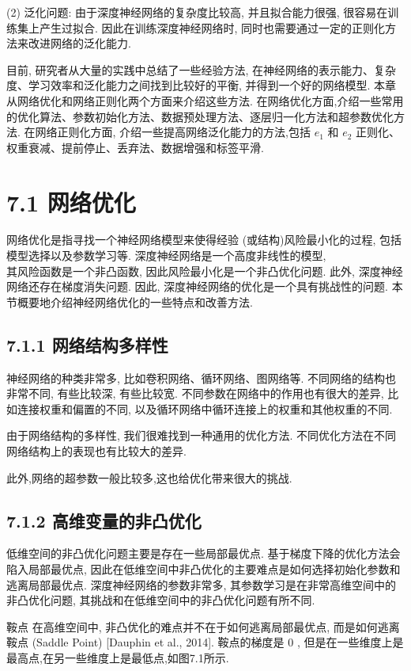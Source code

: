 \documentclass[10pt]{article}
\begin{document}
(2) 泛化问题: 由于深度神经网络的复杂度比较高, 并且拟合能力很强, 很容易在训练集上产生过拟合. 因此在训练深度神经网络时, 同时也需要通过一定的正则化方法来改进网络的泛化能力.

目前, 研究者从大量的实践中总结了一些经验方法, 在神经网络的表示能力、复杂度、学习效率和泛化能力之间找到比较好的平衡, 并得到一个好的网络模型. 本章从网络优化和网络正则化两个方面来介绍这些方法. 在网络优化方面,介绍一些常用的优化算法、参数初始化方法、数据预处理方法、逐层归一化方法和超参数优化方法. 在网络正则化方面, 介绍一些提高网络泛化能力的方法,包括 $e_{1}$ 和 $e_{2}$ 正则化、权重衰减、提前停止、丢弃法、数据增强和标签平滑.

\section*{7.1 网络优化}
网络优化是指寻找一个神经网络模型来使得经验 (或结构)风险最小化的过程, 包括模型选择以及参数学习等. 深度神经网络是一个高度非线性的模型,\\
其风险函数是一个非凸函数, 因此风险最小化是一个非凸优化问题. 此外, 深度神经网络还存在梯度消失问题. 因此, 深度神经网络的优化是一个具有挑战性的问题. 本节概要地介绍神经网络优化的一些特点和改善方法.

\subsection*{7.1.1 网络结构多样性}
神经网络的种类非常多, 比如卷积网络、循环网络、图网络等. 不同网络的结构也非常不同, 有些比较深, 有些比较宽. 不同参数在网络中的作用也有很大的差异, 比如连接权重和偏置的不同, 以及循环网络中循环连接上的权重和其他权重的不同.

由于网络结构的多样性, 我们很难找到一种通用的优化方法. 不同优化方法在不同网络结构上的表现也有比较大的差异.

此外,网络的超参数一般比较多,这也给优化带来很大的挑战.

\subsection*{7.1.2 高维变量的非凸优化}
低维空间的非凸优化问题主要是存在一些局部最优点. 基于梯度下降的优化方法会陷入局部最优点, 因此在低维空间中非凸优化的主要难点是如何选择初始化参数和逃离局部最优点. 深度神经网络的参数非常多, 其参数学习是在非常高维空间中的非凸优化问题, 其挑战和在低维空间中的非凸优化问题有所不同.

鞍点 在高维空间中, 非凸优化的难点并不在于如何逃离局部最优点, 而是如何逃离鞍点 (Saddle Point) [Dauphin et al., 2014]. 鞍点的梯度是 0 , 但是在一些维度上是最高点,在另一些维度上是最低点,如图7.1所示.
\end{document}
